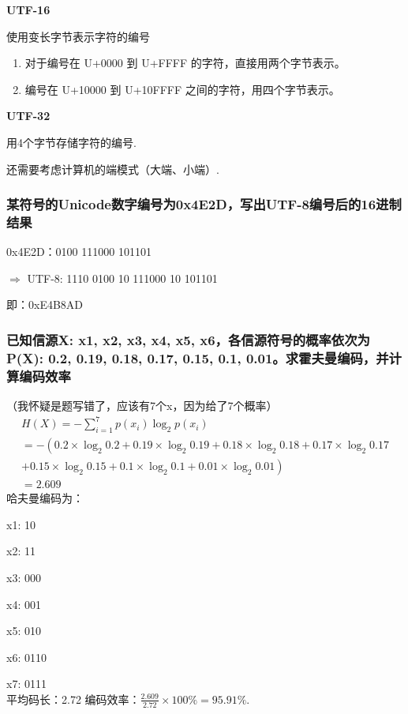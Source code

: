 \documentclass[UTF8,a4paper,AutoFakeBold,AutoFakeSlant]{ctexart}
\begin{document}
\textbf{UTF-16}

使用变长字节表示字符的编号
\begin{enumerate}
	\item 对于编号在 U+0000 到 U+FFFF 的字符，直接用两个字节表示。
	\item 编号在 U+10000 到 U+10FFFF 之间的字符，用四个字节表示。
\end{enumerate}

\textbf{UTF-32}

用4个字节存储字符的编号.

还需要考虑计算机的端模式（大端、小端）.


\subsubsection{某符号的Unicode数字编号为0x4E2D，写出UTF-8编号后的16进制结果}

0x4E2D：0100 111000 101101

$\Longrightarrow$ UTF-8: 1110 0100 10 111000 10 101101

即：0xE4B8AD


\subsubsection{已知信源X: {x1, x2, x3, x4, x5, x6}，各信源符号的概率依次为 P(X): {0.2, 0.19, 0.18, 0.17, 0.15, 0.1, 0.01}。求霍夫曼编码，并计算编码效率}

（我怀疑是题写错了，应该有7个x，因为给了7个概率）
\begin{equation*}
	\begin{array}{l}
		H(X) = -\sum_{i = 1}^{7} p\left(x_{i}\right) \log _{2} p\left(x_{i}\right) \\ = -\left(0.2 \times \log _{2} 0.2+0.19 \times \log _{2} 0.19+0.18 \times \log _{2} 0.18+0.17 \times \log _{2} 0.17\right. \\
		\left.+0.15 \times \log _{2} 0.15+0.1 \times \log _{2} 0.1+0.01 \times \log _{2} 0.01\right) \\ = 2.609 
		\end{array}
\end{equation*}
哈夫曼编码为：

x1: 10

x2: 11

x3: 000

x4: 001

x5: 010

x6: 0110

x7: 0111\\
平均码长：2.72
编码效率：$\frac{2.609}{2.72}\times 100\% = 95.91\%$.
\end{document}
